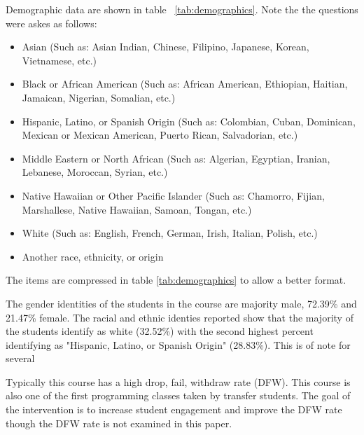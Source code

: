 \documentclass[12pt]{article}
\begin{document}
Demographic data are shown in table ~\ref{tab:demographics}. Note the the questions were askes as follows: 
\begin{itemize}
    \item Asian (Such as: Asian Indian, Chinese, Filipino, Japanese, Korean, Vietnamese, etc.) 
    \item Black or African American (Such as: African American, Ethiopian, Haitian, Jamaican, Nigerian, Somalian, etc.)
    \item Hispanic, Latino, or Spanish Origin (Such as: Colombian, Cuban, Dominican, Mexican or Mexican American, Puerto Rican, Salvadorian, etc.)
    \item Middle Eastern or North African (Such as: Algerian, Egyptian, Iranian, Lebanese, Moroccan, Syrian, etc.)
    \item Native Hawaiian or Other Pacific Islander (Such as: Chamorro, Fijian, Marshallese, Native Hawaiian, Samoan, Tongan, etc.)
    \item  White (Such as: English, French, German, Irish, Italian, Polish, etc.)
    \item Another race, ethnicity, or origin
\end{itemize}
The items are compressed in table \ref{tab:demographics} to allow a better format.

The gender identities of the students in the course are majority male, 72.39\% and 21.47\% female.  The racial and ethnic identies reported show that the majority of the students identify as white (32.52\%) with the second highest percent identifying as "Hispanic, Latino, or Spanish Origin" (28.83\%). This is of note for several 

Typically this course has a high drop, fail, withdraw rate (DFW).  This course is also one of the first programming classes taken by transfer students.  The goal of the intervention is to increase student engagement and improve the DFW rate though the DFW rate is not examined in this paper.  
\end{document}
